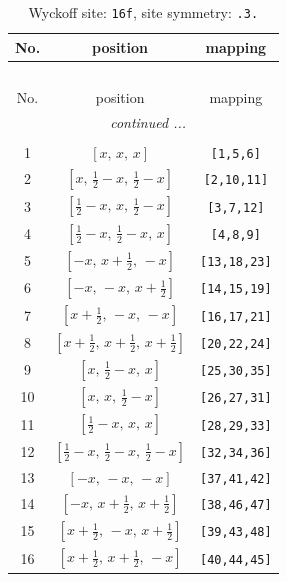 \documentclass[fleqn,8pt]{jsarticle}
\begin{document}
\begin{longtable}{ccc}
\caption{Wyckoff site: {\tt 16f}, site symmetry: {\tt .3.}}
 \\
 \hline \hline
No. & position & mapping \\ \hline \endfirsthead

\multicolumn{2}{l}{\tablename\ \thetable{}} \\
 \hline \hline
No. & position & mapping \\ \hline \endhead

 \hline \hline
\multicolumn{2}{r}{\footnotesize\it continued ...} \\ \endfoot

 \hline \hline
\multicolumn{2}{r}{} \\ \endlastfoot

1 & $\left[ x,\, x,\, x \right]$ & {\tt [1,5,6]} \\ \hline
2 & $\left[ x,\, \frac{1}{2} - x,\, \frac{1}{2} - x \right]$ & {\tt [2,10,11]} \\ \hline
3 & $\left[ \frac{1}{2} - x,\, x,\, \frac{1}{2} - x \right]$ & {\tt [3,7,12]} \\ \hline
4 & $\left[ \frac{1}{2} - x,\, \frac{1}{2} - x,\, x \right]$ & {\tt [4,8,9]} \\ \hline
5 & $\left[ - x,\, x + \frac{1}{2},\, - x \right]$ & {\tt [13,18,23]} \\ \hline
6 & $\left[ - x,\, - x,\, x + \frac{1}{2} \right]$ & {\tt [14,15,19]} \\ \hline
7 & $\left[ x + \frac{1}{2},\, - x,\, - x \right]$ & {\tt [16,17,21]} \\ \hline
8 & $\left[ x + \frac{1}{2},\, x + \frac{1}{2},\, x + \frac{1}{2} \right]$ & {\tt [20,22,24]} \\ \hline
9 & $\left[ x,\, \frac{1}{2} - x,\, x \right]$ & {\tt [25,30,35]} \\ \hline
10 & $\left[ x,\, x,\, \frac{1}{2} - x \right]$ & {\tt [26,27,31]} \\ \hline
11 & $\left[ \frac{1}{2} - x,\, x,\, x \right]$ & {\tt [28,29,33]} \\ \hline
12 & $\left[ \frac{1}{2} - x,\, \frac{1}{2} - x,\, \frac{1}{2} - x \right]$ & {\tt [32,34,36]} \\ \hline
13 & $\left[ - x,\, - x,\, - x \right]$ & {\tt [37,41,42]} \\ \hline
14 & $\left[ - x,\, x + \frac{1}{2},\, x + \frac{1}{2} \right]$ & {\tt [38,46,47]} \\ \hline
15 & $\left[ x + \frac{1}{2},\, - x,\, x + \frac{1}{2} \right]$ & {\tt [39,43,48]} \\ \hline
16 & $\left[ x + \frac{1}{2},\, x + \frac{1}{2},\, - x \right]$ & {\tt [40,44,45]} \\
\end{longtable}
\end{document}

